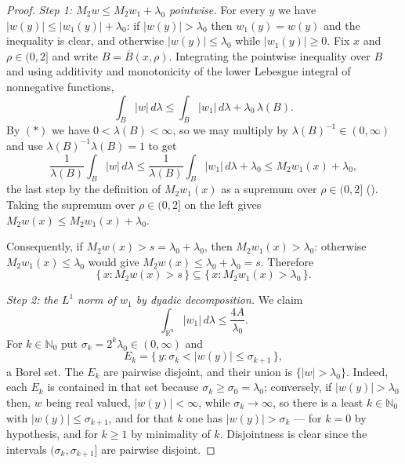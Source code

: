\begin{proof}
\emph{Step 1: $M_2w \leq M_2w_1 + \lambda_0$ pointwise.}
For every $y$ we have $|w(y)| \leq |w_1(y)| + \lambda_0$: if
$|w(y)| > \lambda_0$ then $w_1(y) = w(y)$ and the inequality is clear, and
otherwise $|w(y)| \leq \lambda_0$ while $|w_1(y)| \geq 0$.  Fix $x$ and
$\rho \in (0,2]$ and write $B = \overline B(x,\rho)$.  Integrating the pointwise
inequality over $B$ and using additivity and monotonicity of the lower Lebesgue
integral of nonnegative functions,
\[
  \int_B|w|\,d\lambda \leq \int_B|w_1|\,d\lambda + \lambda_0\,\lambda(B) .
\]
By $(*)$ we have $0 < \lambda(B) < \infty$, so we may multiply by
$\lambda(B)^{-1} \in (0,\infty)$ and use
$\lambda(B)^{-1}\lambda(B) = 1$ to get
\[
  \frac{1}{\lambda(B)}\int_B|w|\,d\lambda
    \leq \frac{1}{\lambda(B)}\int_B|w_1|\,d\lambda + \lambda_0
    \leq M_2w_1(x) + \lambda_0 ,
\]
the last step by the definition of $M_2w_1(x)$ as a supremum over
$\rho \in (0,2]$ ().  Taking the supremum over
$\rho \in (0,2]$ on the left gives $M_2w(x) \leq M_2w_1(x) + \lambda_0$.

Consequently, if $M_2w(x) > s = \lambda_0 + \lambda_0$, then
$M_2w_1(x) > \lambda_0$: otherwise $M_2w_1(x) \leq \lambda_0$ would give
$M_2w(x) \leq \lambda_0 + \lambda_0 = s$.  Therefore
\begin{equation*}
  \{\,x : M_2w(x) > s\,\} \subseteq \{\,x : M_2w_1(x) > \lambda_0\,\} . \tag{2}
\end{equation*}

\emph{Step 2: the $L^1$ norm of $w_1$ by dyadic decomposition.}
We claim
\begin{equation*}
  \int_{\mathbb{R}^n}|w_1|\,d\lambda \leq \frac{4A}{\lambda_0} . \tag{3}
\end{equation*}
For $k \in \mathbb{N}_0$ put $\sigma_k = 2^k\lambda_0 \in (0,\infty)$ and
\[
  E_k = \{\,y : \sigma_k < |w(y)| \leq \sigma_{k+1}\,\} ,
\]
a Borel set.  The $E_k$ are pairwise disjoint, and their union is
$\{|w| > \lambda_0\}$.  Indeed, each $E_k$ is contained in that set because
$\sigma_k \geq \sigma_0 = \lambda_0$; conversely, if $|w(y)| > \lambda_0$ then,
$w$ being real valued, $|w(y)| < \infty$, while $\sigma_k \to \infty$, so there
is a least $k \in \mathbb{N}_0$ with $|w(y)| \leq \sigma_{k+1}$, and for that
$k$ one has $|w(y)| > \sigma_k$ --- for $k = 0$ by hypothesis, and for
$k \geq 1$ by minimality of $k$.  Disjointness is clear since the intervals
$(\sigma_k,\sigma_{k+1}]$ are pairwise disjoint.


\end{proof}
